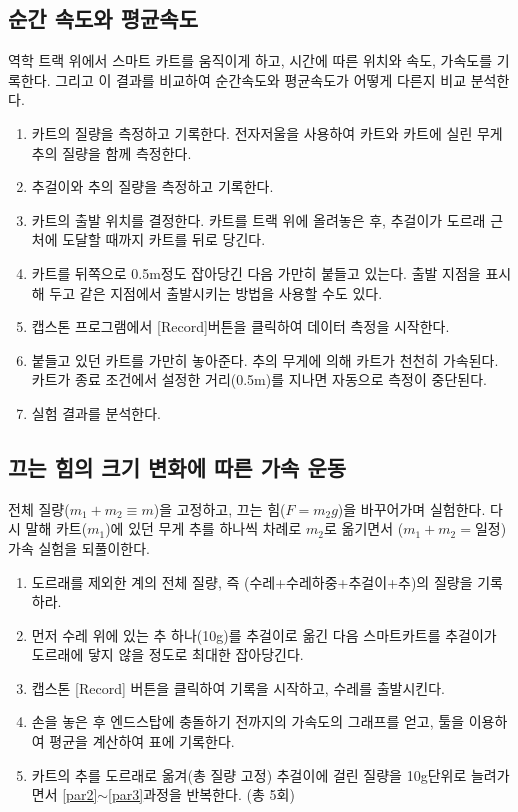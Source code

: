 \documentclass[12pt,a4paper]{article}
\begin{document}
\subsection{순간 속도와 평균속도}
역학 트랙 위에서 스마트 카트를 움직이게 하고, 시간에 따른 위치와 속도, 가속도를
기록한다. 그리고 이 결과를 비교하여 순간속도와 평균속도가 어떻게 다른지 비교 분석한다.
\begin{enumerate}
    \item 카트의 질량을 측정하고 기록한다. 전자저울을 사용하여 카트와 카트에 실린
        무게추의 질량을 함께 측정한다.
    \item 추걸이와 추의 질량을 측정하고 기록한다.
    \item 카트의 출발 위치를 결정한다. 카트를 트랙 위에 올려놓은 후, 추걸이가 도르래
        근처에 도달할 때까지 카트를 뒤로 당긴다.
    \item 카트를 뒤쪽으로 0.5m정도 잡아당긴 다음 가만히 붙들고 있는다. 출발 지점을
        표시해 두고 같은 지점에서 출발시키는 방법을 사용할 수도 있다.
    \item 캡스톤 프로그램에서 [Record]버튼을 클릭하여 데이터 측정을 시작한다.
    \item 붙들고 있던 카트를 가만히 놓아준다. 추의 무게에 의해 카트가 천천히
        가속된다. 카트가 종료 조건에서 설정한 거리(0.5m)를 지나면 자동으로 측정이
        중단된다.
    \item 실험 결과를 분석한다.
\end{enumerate}
\subsection{끄는 힘의 크기 변화에 따른 가속 운동}
전체 질량($m_1+m_2\equiv m$)을 고정하고, 끄는 힘($F=m_2g$)을 바꾸어가며 실험한다.
다시 말해 카트($m_1$)에 있던 무게 추를 하나씩 차례로 $m_2$로 옮기면서
($m_1+m_2=$일정) 가속 실험을 되풀이한다.
\begin{enumerate}
    \item 도르래를 제외한 계의 전체 질량, 즉 (수레+수레하중+추걸이+추)의 질량을
        기록하라.
    \item \label{par2}먼저 수레 위에 있는 추 하나(10g)를 추걸이로 옮긴 다음
        스마트카트를 추걸이가 도르래에 닿지 않을 정도로 최대한 잡아당긴다.
    \item \label{par3}캡스톤 [Record] 버튼을 클릭하여 기록을 시작하고, 수레를
        출발시킨다.
    \item 손을 놓은 후 엔드스탑에 충돌하기 전까지의 가속도의 그래프를 얻고, 툴을
        이용하여 평균을 계산하여 표에 기록한다.
    \item 카트의 추를 도르래로 옮겨(총 질량 고정) 추걸이에 걸린 질량을 10g단위로
        늘려가면서 \ref{par2}$\sim$\ref{par3}과정을 반복한다. (총 5회)
\end{enumerate}
\end{document}
